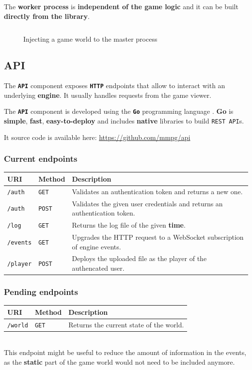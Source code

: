 \documentclass[a4paper,11pt]{article}
\begin{document}
The \textbf{worker process} is \textbf{independent of the game logic} and it can be built \textbf{directly from the library}.
\begin{figure}[!h]
\inputminted[linenos,fontsize=\small,frame=lines,framesep=2mm]{c++}{code/master.cpp}
\caption{Injecting a game world to the master process}
\label{world_injection}
\end{figure}
\subsection{API}
The \textbf{\texttt{API}} component exposes \textbf{\texttt{HTTP}} endpoints that allow to interact with an underlying \textbf{engine}. It
usually handles requests from the game viewer.

The \textbf{\texttt{API}} component is developed using the \textbf{\texttt{Go}} programming language \cite{golang}. \textbf{Go}
is \textbf{simple}, \textbf{fast}, \textbf{easy-to-deploy} and includes \textbf{native} libraries to build \texttt{REST API}s.

It source code is available here: \url{https://github.com/mmpg/api}
\subsubsection{Current endpoints}
\begin{tabularx}{\textwidth}{l | l | X}
\textbf{URI} & \textbf{Method} & \textbf{Description}\\
\hline
\texttt{/auth} & \texttt{GET} & Validates an authentication token and returns a new one.\\
\texttt{/auth} & \texttt{POST} & Validates the given user credentials and returns an authentication token.\\
\texttt{/log} & \texttt{GET} & Returns the log file of the given \textbf{time}.\\
\texttt{/events} & \texttt{GET} & Upgrades the HTTP request to a WebSocket subscription of engine events.\\
\texttt{/player} & \texttt{POST} & Deploys the uploaded file as the player of the authencated user.\\
\end{tabularx}
\subsubsection{Pending endpoints}
\begin{tabularx}{\textwidth}{l | l | X}
\textbf{URI} & \textbf{Method} & \textbf{Description}\\
\hline
\texttt{/world} & \texttt{GET} & Returns the current state of the world.\\
\end{tabularx}
\\[0.2cm]
\indent
This endpoint might be useful to reduce the amount of information in the events, as the \textbf{static} part of
the game world would not need to be included anymore.
\end{document}
